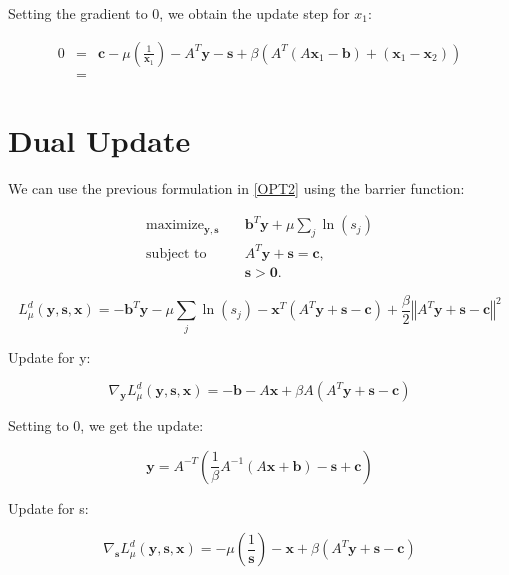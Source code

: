 \documentclass{article}
\begin{document}
Setting the gradient to $0$, we obtain the update step for $x_{1}$:

\begin{eqnarray*}
0 & = & \mathbf{c}-\mu\left(\frac{1}{\mathbf{x}_{1}}\right)-A^{T}\mathbf{y}-\mathbf{s}+\beta\left(A^{T}\left(A\mathbf{x}_{1}-\mathbf{b}\right)+\left(\mathbf{x}_{1}-\mathbf{x}_{2}\right)\right)\\
 & =
\end{eqnarray*}



\section*{Dual Update}
We can use the previous formulation in \eqref{OPT2} using the barrier function:

\begin{align}
\text{maximize}_{\mathbf{y}, \mathbf{s}} &\quad \mathbf{b}^T\mathbf{y} + \mu \sum_j \ln (s_j)  \tag{OPT5}\label{OPT5} \\
\text{subject to } &\quad  A^T \mathbf{y}  + \mathbf{s} = \mathbf{c},  \nonumber \\
&\quad \mathbf{s} > \mathbf{0} \nonumber.
\end{align}

\[
L_{\mu}^{d}(\mathbf{y},\mathbf{s},\mathbf{x})=-\mathbf{b}^{T}\mathbf{y}-\mu\sum_{j}\ln\left(s_{j}\right)-\mathbf{x}^{T}\left(A^{T}\mathbf{y}+\mathbf{s}-\mathbf{c}\right)+\frac{\beta}{2}\left\Vert A^{T}\mathbf{y}+\mathbf{s}-\mathbf{c}\right\Vert ^{2}
\]


Update for y:

\[
\nabla_{\mathbf{y}}L_{\mu}^{d}(\mathbf{y},\mathbf{s},\mathbf{x})=-\mathbf{b}-A\mathbf{x}+\beta A\left(A^{T}\mathbf{y}+\mathbf{s}-\mathbf{c}\right)
\]


Setting to 0, we get the update:

\[
\mathbf{y}=A^{-T}\left(\frac{1}{\beta}A^{-1}\left(A\mathbf{x}+\mathbf{b}\right)-\mathbf{s}+\mathbf{c}\right)
\]


Update for s:

\[
\nabla_{\mathbf{s}}L_{\mu}^{d}(\mathbf{y},\mathbf{s},\mathbf{x})=-\mu\left(\frac{1}{\mathbf{s}}\right)-\mathbf{x}+\beta\left(A^{T}\mathbf{y}+\mathbf{s}-\mathbf{c}\right)
\]
\newpage
\vspace{0.4in}
%

\end{document}
